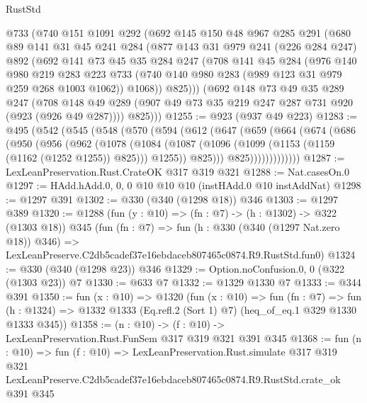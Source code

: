 \begin{lexlean}{RustStd}
\begin{coremodule}
    @733
    (@740
      @151
      @1091
      @292
      (@692
        @145
        @150
        @48
        @967
        @285
        @291
        (@680
          @89
          @141
          @31
          @45
          @241
          @284
          (@877
            @143
            @31
            @979
            @241
            (@226 @284 @247)
            @892
            (@692
              @141
              @73
              @45
              @35
              @284
              @247
              (@708
                @141
                @45
                @284
                (@976
                  @140
                  @980
                  @219
                  @283
                  @223
                  @733
                  (@740 @140 @980 @283 (@989 @123 @31 @979 @259 @268 @1003 @1062))
                  @1068))
              @825)))
        (@692
          @148
          @73
          @49
          @35
          @289
          @247
          (@708 @148 @49 @289 (@907 @49 @73 @35 @219 @247 @287 @731 @920 (@923 (@926 @49 @287))))
          @825)))
@1255 := @923 (@937 @49 @223)
@1283 := @495
    (@542
      (@545
        (@548
          (@570
            (@594
              (@612
                (@647
                  (@659
                    (@664
                      (@674
                        (@686
                          (@950
                            (@956
                              (@962
                                (@1078
                                  (@1084
                                    (@1087
                                      (@1096
                                        (@1099 (@1153 (@1159 (@1162 (@1252 @1255)) @825)))
                                        @1255))
                                    @825)))
                              @825)))))))))))))
@1287 := LexLeanPreservation.Rust.CrateOK @317 @319 @321
@1288 := Nat.casesOn.{0}
@1297 := HAdd.hAdd.{0, 0, 0} @10 @10 @10 (instHAdd.{0} @10 instAddNat)
@1298 := @1297 @391
@1302 := @330 (@340 (@1298 @18)) @346
@1303 := @1297 @389
@1320 := @1288
    (fun (y : @10) => (fn : @7) -> (h : @1302) -> @322 (@1303 @18))
    @345
    (fun (fn : @7) =>
    fun (h : @330 (@340 (@1297 Nat.zero @18)) @346) =>
    LexLeanPreserve.C2db5cadef37e16ebdaceb807465c0874.R9.RustStd.fun0)
@1324 := @330 (@340 (@1298 @23)) @346
@1329 := Option.noConfusion.{0, 0} (@322 (@1303 @23)) @7
@1330 := @633 @7
@1332 := @1329 @1330 @7
@1333 := @344 @391
@1350 := fun (x : @10) =>
  @1320
    (fun (x : @10) =>
    fun (fn : @7) =>
    fun (h : @1324) => @1332 @1333 (Eq.refl.{2} (Sort 1) @7) (heq_of_eq.{1} @329 @1330 @1333 @345))
@1358 := (n : @10) -> (f : @10) -> LexLeanPreservation.Rust.FunSem @317 @319 @321 @391 @345
@1368 := fun (n : @10) =>
  fun (f : @10) =>
  LexLeanPreservation.Rust.simulate
    @317
    @319
    @321
    LexLeanPreserve.C2db5cadef37e16ebdaceb807465c0874.R9.RustStd.crate_ok
    @391
    @345
\end{coremodule}
\end{lexlean}
